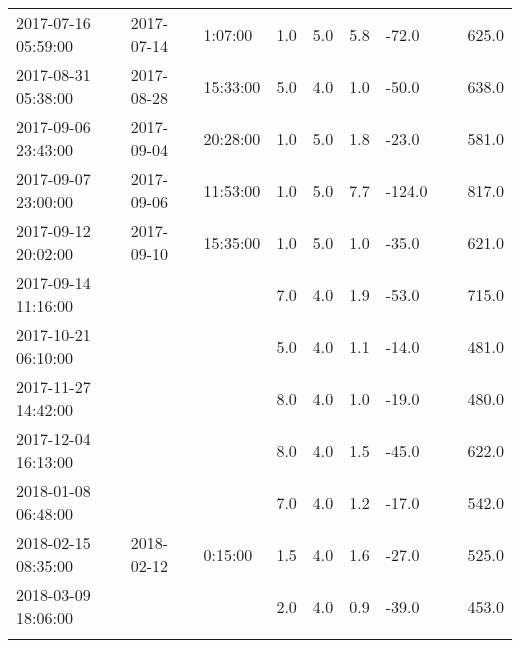 \begin{longtable}{lllllllll}
        2017-07-16 05:59:00 & 2017-07-14 & 1:07:00 & 1.0 & 5.0 & 5.8 & -72.0 & ~ & 625.0 \\ 
        2017-08-31 05:38:00 & 2017-08-28 & 15:33:00 & 5.0 & 4.0 & 1.0 & -50.0 & ~ & 638.0 \\ 
        2017-09-06 23:43:00 & 2017-09-04 & 20:28:00 & 1.0 & 5.0 & 1.8 & -23.0 & ~ & 581.0 \\ 
        2017-09-07 23:00:00 & 2017-09-06 & 11:53:00 & 1.0 & 5.0 & 7.7 & -124.0 & ~ & 817.0 \\ 
        2017-09-12 20:02:00 & 2017-09-10 & 15:35:00 & 1.0 & 5.0 & 1.0 & -35.0 & ~ & 621.0 \\ 
        2017-09-14 11:16:00 & ~ & ~ & 7.0 & 4.0 & 1.9 & -53.0 & ~ & 715.0 \\ 
        2017-10-21 06:10:00 & ~ & ~ & 5.0 & 4.0 & 1.1 & -14.0 & ~ & 481.0 \\ 
        2017-11-27 14:42:00 & ~ & ~ & 8.0 & 4.0 & 1.0 & -19.0 & ~ & 480.0 \\ 
        2017-12-04 16:13:00 & ~ & ~ & 8.0 & 4.0 & 1.5 & -45.0 & ~ & 622.0 \\ 
        2018-01-08 06:48:00 & ~ & ~ & 7.0 & 4.0 & 1.2 & -17.0 & ~ & 542.0 \\ 
        2018-02-15 08:35:00 & 2018-02-12 & 0:15:00 & 1.5 & 4.0 & 1.6 & -27.0 & ~ & 525.0 \\ 
        2018-03-09 18:06:00 & ~ & ~ & 2.0 & 4.0 & 0.9 & -39.0 & ~ & 453.0 \\
\bottomrule
\label{tabla_FE_Auger}
\end{longtable}
